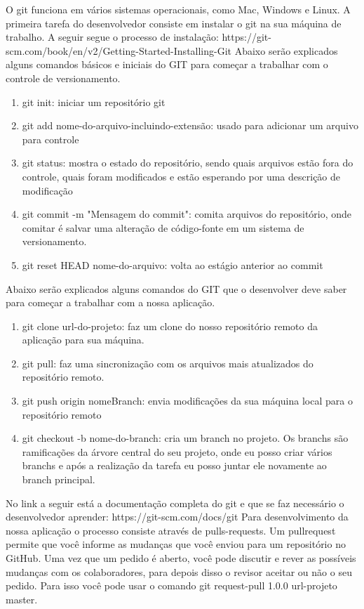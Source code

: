 \documentclass[	DIV=calc,%
							paper=a4,%
							fontsize=12pt,%
							onecolumn]{scrartcl}	 					%
\begin{document}
O git funciona em vários sistemas operacionais, como Mac, Windows e Linux. A primeira tarefa
do desenvolvedor consiste em instalar o git na sua máquina de trabalho. A seguir segue o processo de
instalação: https://git-scm.com/book/en/v2/Getting-Started-Installing-Git
Abaixo serão explicados alguns comandos básicos e iniciais do GIT para começar a trabalhar com
o controle de versionamento.


\begin{enumerate}
	\item git init: iniciar um repositório git
	\item git add nome-do-arquivo-incluindo-extensão: usado para adicionar um arquivo para controle
	\item git status: mostra o estado do repositório, sendo quais arquivos estão fora do controle, quais
	foram modificados e estão esperando por uma descrição de modificação
	\item git commit -m "Mensagem do commit": comita arquivos do repositório, onde comitar é salvar
	uma alteração de código-fonte em um sistema de versionamento.
	\item git reset HEAD nome-do-arquivo: volta ao estágio anterior ao commit
\end{enumerate}

Abaixo serão explicados alguns comandos do GIT que o desenvolver deve saber para começar a
trabalhar com a nossa aplicação.


\begin{enumerate}
	\item git clone url-do-projeto: faz um clone do nosso repositório remoto da aplicação para sua
	máquina.
	\item git pull: faz uma sincronização com os arquivos mais atualizados do repositório remoto.
	\item git push origin nomeBranch: envia modificações da sua máquina local para o repositório
	remoto
	\item git checkout -b nome-do-branch: cria um branch no projeto. Os branchs são ramificações da
	árvore central do seu projeto, onde eu posso criar vários branchs e após a realização da tarefa eu
	posso juntar ele novamente ao branch principal.
\end{enumerate}

No link a seguir está a documentação completa do git e que se faz necessário o desenvolvedor
aprender: https://git-scm.com/docs/git
Para desenvolvimento da nossa aplicação o processo consiste através de pulls-requests. Um pullrequest
permite que você informe as mudanças que você enviou para um repositório no GitHub. Uma
vez que um pedido é aberto, você pode discutir e rever as possíveis mudanças com os colaboradores,
para depois disso o revisor aceitar ou não o seu pedido.
Para isso você pode usar o comando git request-pull 1.0.0 url-projeto master.
\end{document}

